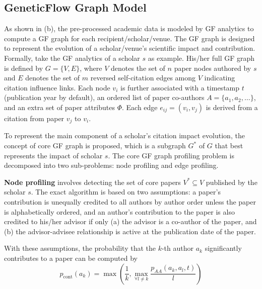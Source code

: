 \subsection{GeneticFlow Graph Model}

As shown in (b), the pre-processed academic data is modeled by GF analytics \cite{luo2023impact} to compute a GF graph for each recipient/scholar/venue. %
The GF graph is designed to represent the evolution of a scholar/venue's scientific impact and contribution. Formally, take the GF analytics of a scholar \( s \) as example. His/her full GF graph is defined by \( G = \{V, E\} \), where \( V \) denotes the set of \( n \) paper nodes authored by \( s \) and \( E \) denotes the set of \( m \) reversed self-citation edges among \( V \) indicating citation influence links. Each node \( v_i \) is further associated with a timestamp \( t \) (publication year by default), an ordered list of paper co-authors \( A = \{a_1, a_2, \ldots\} \), and an extra set of paper attributes \( \Phi \). Each edge \( e_{ij} = (v_i, v_j) \) is derived from a citation from paper \( v_j \) to \( v_i \).

To represent the main component of a scholar's citation impact evolution, the concept of core GF graph is proposed, which is a subgraph \( G^* \) of \( G \) that best represents the impact of scholar \( s \). The core GF graph profiling problem is decomposed into two sub-problems: node profiling and edge profiling.

\textbf{Node profiling} involves detecting the set of core papers \( V^* \subseteq V \) published by the scholar \( s \). The exact algorithm is based on two assumptions: a paper's contribution is unequally credited to all authors by author order unless the paper is alphabetically ordered, and an author's contribution to the paper is also credited to his/her advisor if only (a) the advisor is a co-author of the paper, and (b) the advisor-advisee relationship is active at the publication date of the paper.

With these assumptions, the probability that the \( k \)-th author \( a_k \) significantly contributes to a paper can be computed by
\begin{equation}
p_{\text{cont}}(a_k) = \max \left(\frac{1}{k}, \max_{\forall l \neq k} \frac{p_{AA}(a_k, a_l, t)}{l}\right)
\label{eq:author}
\end{equation}


